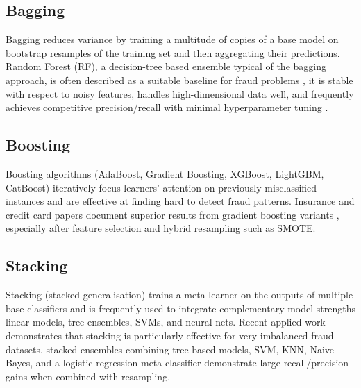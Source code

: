 \documentclass[12pt,a4paper,oneside]{report}
\numberwithin{equation}{chapter}
\begin{document}
\subsection{Bagging}

Bagging reduces variance by training a multitude of copies of a base model on bootstrap resamples
of the training set and then aggregating their predictions. Random Forest (RF), a decision-tree
based ensemble typical of the bagging approach, is often described as a suitable baseline for
fraud problems ,\cite{Ming2024,Eteng2025} it is stable with respect to noisy features, handles high-dimensional data well,
and frequently achieves competitive precision/recall with minimal hyperparameter tuning
.

\subsection{Boosting}

Boosting algorithms (AdaBoost, Gradient Boosting, XGBoost, LightGBM, CatBoost) iteratively focus
learners' attention on previously misclassified instances and are effective at finding hard to detect
fraud patterns. Insurance and credit card papers document superior results from gradient boosting
variants \cite{Ming2024,Khalid2024}, especially after feature selection and hybrid resampling
such as SMOTE.

\subsection{Stacking}

Stacking (stacked generalisation) trains a meta-learner on the outputs of multiple base classifiers
and is frequently used to integrate complementary model strengths linear models, tree ensembles,
SVMs, and neural nets. Recent applied work demonstrates that stacking is particularly effective for
very imbalanced fraud datasets,  \cite{Eteng2025,BDCC2022} stacked ensembles combining tree-based models, SVM, KNN, Naive
Bayes, and a logistic regression meta-classifier demonstrate large recall/precision gains when
combined with resampling.
\end{document}
